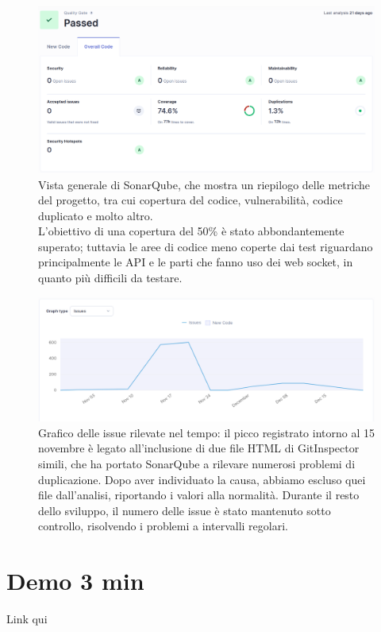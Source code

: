 \documentclass{article}
\begin{document}
\begin{figure}[H]
    \centering
    \includegraphics[width=1\textwidth]{report-sq_overview}
    \caption{Vista generale di SonarQube, che mostra un riepilogo delle metriche del progetto, tra cui copertura del codice, vulnerabilità, codice duplicato 
    e molto altro. \\
    L'obiettivo di una copertura del 50\% è stato abbondantemente superato; tuttavia le aree di codice meno coperte dai test riguardano principalmente le API 
    e le parti che fanno uso dei web socket, in quanto più difficili da testare.}
    \label{fig:sq_overview}
\end{figure}

\begin{figure}[H]
    \centering
    \includegraphics[width=1\textwidth]{report-sq_issues}
    \caption{Grafico delle issue rilevate nel tempo: il picco registrato intorno al 15 novembre è legato all'inclusione di due file HTML di GitInspector simili, 
    che ha portato SonarQube a rilevare numerosi problemi di duplicazione. Dopo aver individuato la causa, abbiamo escluso quei file dall'analisi, riportando 
    i valori alla normalità. Durante il resto dello sviluppo, il numero delle issue è stato mantenuto sotto controllo, risolvendo i problemi a intervalli regolari.}
    \label{fig:sq_issues}
\end{figure}


\section{Demo 3 min}
Link qui
\end{document}
